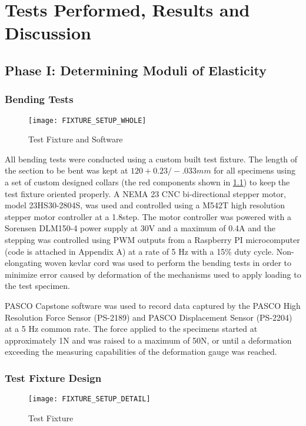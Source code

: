 \chapter{Tests Performed, Results and Discussion} \label{chap:tests}
\section{Phase I: Determining Moduli of Elasticity}
\subsection{Bending Tests}
\begin{figure} [H]
\centering
	\caption{Test Fixture and Software}
	\texttt{[image: FIXTURE\_SETUP\_WHOLE]}
	\label{fig:test_fixture}
\end{figure}

All bending tests were conducted using a custom built test fixture. The length of the section to be bent was kept at $120 +0.23/-.033 mm$ for all specimens using a set of custom designed collars (the red components shown in \ref{fig:test_fixture}) to keep the test fixture oriented properly. A NEMA 23 CNC bi-directional stepper motor, model 23HS30-2804S, was used and controlled using a M542T high resolution stepper motor controller at a 1.8\degree step. The motor controller was powered with a Sorensen DLM150-4 power supply at 30V and a maximum of 0.4A and the stepping was controlled using PWM outputs from a Raspberry PI microcomputer (code is attached in Appendix A) at a rate of 5 Hz with a 15\% duty cycle. Non-elongating woven kevlar cord was used to perform the bending tests in order to minimize error caused by deformation of the mechanisms used to apply loading to the test specimen. \par

	PASCO Capstone software was used to record data captured by the PASCO High Resolution Force Sensor (PS-2189) and PASCO Displacement Sensor (PS-2204) at a 5 Hz common rate. The force applied to the specimens started at approximately 1N and was raised to a maximum of 50N, or until a deformation exceeding the measuring capabilities of the deformation gauge was reached.

\subsection{Test Fixture Design}
\begin{figure} [H]
\centering
	\caption{Test Fixture}
	\texttt{[image: FIXTURE\_SETUP\_DETAIL]}
	\label{fig:test_fixture_detail}
\end{figure}

